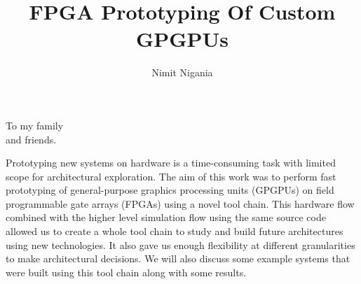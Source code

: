 \documentclass[12pt]{gatech-thesis}
\title{FPGA Prototyping Of Custom GPGPUs} %
\author{Nimit Nigania}
\begin{document}

\begin{preliminary}
\begin{dedication}
\null\vfil
{\large
\begin{center}
To my family\\\vspace{12pt}
and friends.\\\vspace{12pt}

\end{center}}
\vfil\null
\end{dedication}

\begin{preface}
Prototyping new systems on hardware is a time-consuming task with limited scope for architectural exploration. The aim of this work was to perform fast prototyping of general-purpose graphics processing units (GPGPUs) on field programmable gate arrays (FPGAs) using a novel tool chain. This hardware flow combined with the higher level simulation flow using the same source code allowed us to create a whole tool chain to study and build future architectures using new technologies. It also gave us enough flexibility at different granularities to make architectural decisions. We will also discuss some example systems that were built using this tool chain along with some results.
\end{preface}

\begin{acknowledgements}

\end{acknowledgements}
\contents
\end{preliminary}
\end{document}
